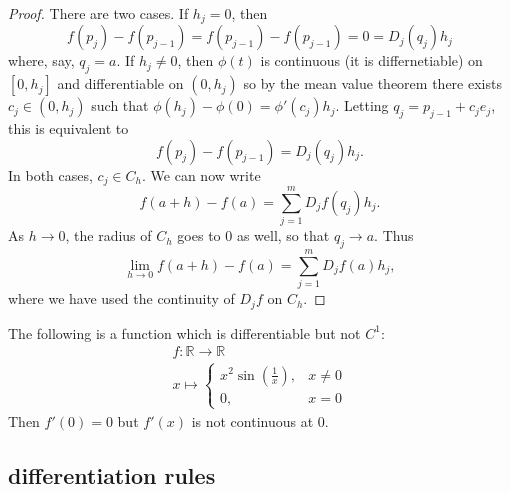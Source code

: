 \documentclass[12pt]{article}
\begin{document}
\begin{proof}
	There are two cases. If $h_j=0$, then 
	\begin{equation*}
		f(p_j) - f(p_{j-1}) = f(p_{j-1})-f(p_{j-1})=0 = D_j(q_j)h_j
	\end{equation*}
	where, say, $q_j=a$. If $h_j\neq 0$, then $\phi(t)$ is continuous (it is differnetiable) on $[0, h_j]$ and differentiable on $(0, h_j)$ so by the mean value theorem there exists $c_j\in (0, h_j)$ such that $\phi(h_j)-\phi(0)=\phi'(c_j)h_j$. Letting $q_j=p_{j-1}+c_je_j$, this is equivalent to 
	\begin{equation*}
		f(p_j)-f(p_{j-1}) = D_j(q_j)h_j.
	\end{equation*}
	In both cases, $c_j\in C_h$. We can now write 
	\begin{equation*}
		f(a+h)-f(a) = \sum_{j=1}^m D_jf(q_j)h_j.
	\end{equation*}
	As $h\to 0$, the radius of $C_h$ goes to 0 as well, so that $q_j\to a$. Thus 
	\begin{equation*}
		\lim_{h\to 0}f(a+h)-f(a) = \sum_{j=1}^m D_jf(a)h_j,
	\end{equation*}
	where we have used the continuity of $D_jf$ on $C_h$.
\end{proof}

\begin{example}
	The following is a function which is differentiable but not $C^1$:
	\begin{gather*}
		f: \mathbb{R} \to \mathbb{R} \\
		x \mapsto \begin{cases} x^2\sin(\frac{1}{x}), & x\neq 0 \\ 0, & x=0 \end{cases}
	\end{gather*}
	Then $f'(0)=0$ but $f'(x)$ is not continuous at $0$.
\end{example}


\subsection{differentiation rules} %
\end{document}
